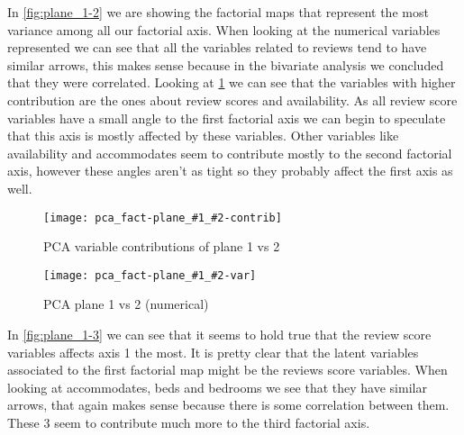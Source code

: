 \newcommand{\factvar}[2]{
    \begin{figure}[H]
        \centering
        \texttt{[image: pca\_fact-plane\_\#1\_\#2-var]}
        \caption{PCA plane #1 vs #2 (numerical)}%
        \label{fig:plane_#1-#2-var}
    \end{figure}
}

\newcommand{\factorialmapCV}[2]{
    \contrib{#1}{#2}
    \factvar{#1}{#2}
}

\newcommand{\contrib}[2]{
    \begin{figure}[H]
        \centering
        \texttt{[image: pca\_fact-plane\_\#1\_\#2-contrib]}
        \caption{PCA variable contributions of plane #1 vs #2}%
        \label{fig:contrib_plane_#1-#2}
    \end{figure}
}

\newcommand{\categorica}[4]{
    \begin{figure}[H]
        \centering
        \texttt{[image: pca\_fact-\#3-plane\_\#1\_\#2]}
        \caption{PCA variable contributions of #4 in plane #1 vs #2}%
        \label{fig:cat-#3-plane-#1-#2}
    \end{figure}
}



In \cref{fig:plane_1-2} we are showing the factorial maps that represent the most variance among all our factorial axis. When looking at the numerical variables represented we can see that all the variables
related to reviews tend to have similar arrows, this makes sense 
because in the bivariate analysis we concluded that they were correlated.
Looking at \cref{fig:contrib_plane_1-2} we can see that the variables
with higher contribution are the ones about review scores and availability. As all review score variables have a small angle to the first factorial axis we can begin to speculate that this axis is 
mostly affected by these variables. Other variables like availability
and accommodates seem to contribute mostly to the second factorial axis, however these angles aren't as tight so they probably affect the first axis as well.

\factorialmapCV{1}{2}


In \cref{fig:plane_1-3} we can see that it seems to hold true that 
the review score variables affects axis 1 the most. It is pretty clear that the latent variables associated to the 
first factorial map might be the reviews score variables. When looking at accommodates, beds and 
bedrooms we see that they have similar arrows, that again makes sense because there is some 
correlation between them. These 3 seem to contribute much more to the third factorial axis.


